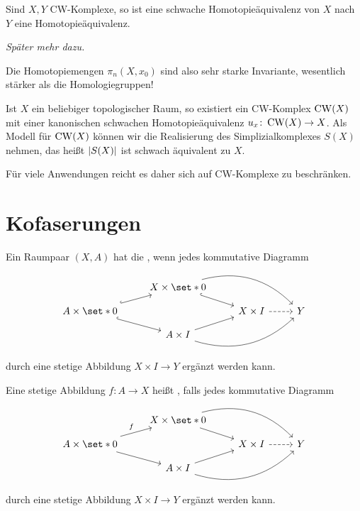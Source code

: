 \begin{satz}[name={Whitehead}]
	Sind $X,Y$ CW-Komplexe, so ist eine schwache Homotopieäquivalenz von $X$ nach $Y$ eine Homotopieäquivalenz.
\end{satz}
\begin{beweis}
	\emph{Später mehr dazu.}
\end{beweis}

\begin{bemerkung}[{name=[Homotopiemengen als Invariante]}]
	Die Homotopiemengen $\pi_n(X,x_0)$ sind also sehr starke Invariante, wesentlich stärker als die Homologiegruppen!
\end{bemerkung}

\begin{bemerkung}[{name=[CW-Approximation]}]
	Ist $X$ ein beliebiger topologischer Raum, so existiert ein CW-Komplex $\CW(X)$ mit einer kanonischen schwachen Homotopieäquivalenz $u_x \colon \CW(X) \to X$.
	Als Modell für $\CW(X)$ können wir die Realisierung des Simplizialkomplexes $S(X)$ nehmen, das heißt $\abs*{S(X)}$ ist schwach äquivalent zu $X$.
\end{bemerkung}

\begin{bemerkung}[{name=[Beschränkung auf CW-Komplexe]}]
	Für viele Anwendungen reicht es daher sich auf CW-Komplexe zu beschränken.
\end{bemerkung}

\section{Kofaserungen} %
\label{sec:kofaserungen}

\begin{definition}
	Ein Raumpaar $(X,A)$ hat die , wenn jedes kommutative Diagramm  
	\[
		\begin{tikzcd}[row sep=small]
			& X \times \set*{0}  \drar[hook] \ar[rrd,bend left] \\
			A \times \set*{0} \urar[hook] \drar[hook] & & X \times I \rar[dashed] & Y \\
			& A \times I \urar \ar[urr,bend right]
		\end{tikzcd}
	\]
	durch eine stetige Abbildung $X \times I \to Y$ ergänzt werden kann.
\end{definition}

\begin{definition}
	Eine stetige Abbildung $f \colon A \to X$ heißt , falls jedes kommutative Diagramm
	\[
		\begin{tikzcd}[row sep=small]
			& X \times \set*{0}  \drar \ar[rrd,bend left] \\
			A \times \set*{0} \urar["f"] \drar & & X \times I \rar[dashed] & Y \\
			& A \times I \urar\ar[urr,bend right]
		\end{tikzcd}
	\] 
	durch eine stetige Abbildung $X \times I \to Y$ ergänzt werden kann.
\end{definition}

